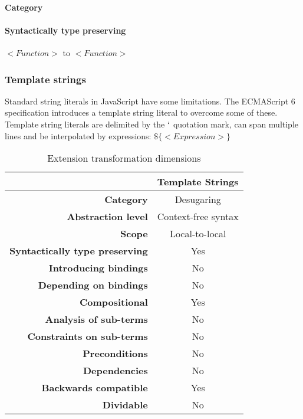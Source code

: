 \paragraph{Category}


\paragraph{Syntactically type preserving}
$<Function>$ to $<Function>$

\subsubsection{Template strings}
Standard string literals in JavaScript have some limitations. The ECMAScript 6 specification introduces a template string literal to overcome some of these\cite[12.2.8]{SpecJS}. Template string literals are delimited by the $`$ quotation mark, can span multiple lines and be interpolated by expressions: $\$\{<Expression>\}$

\begin{table}[h]
\centering
\caption{Extension transformation dimensions}
\label{template-strings-table}
\begin{tabular}{@{}rc@{}}
\toprule
                                       & \multicolumn{1}{l}{\textbf{Template Strings}} \\ \midrule
\textbf{Category}                      & Desugaring
\\
\textbf{Abstraction level}          & Context-free syntax                          \\
\textbf{Scope}                         & Local-to-local                               \\
\textbf{Syntactically type preserving} & Yes                                          \\
\textbf{Introducing bindings}          & No                                          \\%
\textbf{Depending on bindings}         & No                                           \\
\textbf{Compositional}                 & Yes                                          \\
\textbf{Analysis of sub-terms}          & No                                          \\
\textbf{Constraints on sub-terms}       & No                                           \\
\textbf{Preconditions}                 & No                                          \\
\textbf{Dependencies}                  & No                                           \\
\textbf{Backwards compatible}          & Yes                                          \\
\textbf{Dividable}                     & No                                           \\ \bottomrule
\end{tabular}
\end{table}

